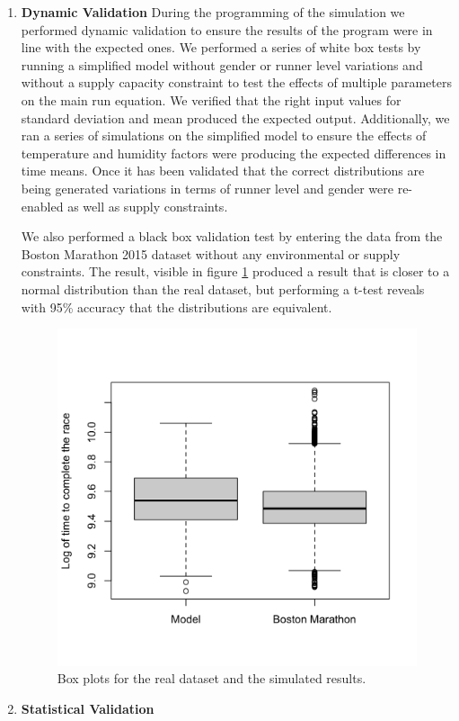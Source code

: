 \documentclass[conference]{IEEEtran}
\begin{document}
\begin{enumerate}
    \item \textbf{Dynamic Validation}
    During the programming of the simulation we performed dynamic validation to ensure the results of the program were in line with the expected ones. We performed a series of white box tests by running a simplified model without gender or runner level variations and without a supply capacity constraint to test the effects of multiple parameters on the main run equation. We verified that the right input values for standard deviation and mean produced the expected output. Additionally, we ran a series of simulations on the simplified model to ensure the effects of temperature and humidity factors were producing the expected differences in time means. Once it has been validated that the correct distributions are being generated variations in terms of runner level and gender were re-enabled as well as supply constraints.

    We also performed a black box validation test by entering the data from the Boston Marathon 2015 dataset without any environmental or supply constraints. The result, visible in figure \ref{fig:blackbox_plot} produced a result that is closer to a normal distribution than the real dataset, but performing a t-test reveals with 95\% accuracy that the distributions are equivalent.

    \begin{figure}[htbp]
        \centerline{\includegraphics[width=\linewidth]{figs/blackbox_plot.png}}
        \caption{Box plots for the real dataset and the simulated results.}
        \label{fig:blackbox_plot}
    \end{figure}

    \item \textbf{Statistical Validation}
\end{enumerate}
\end{document}
